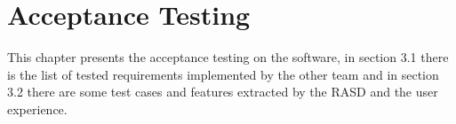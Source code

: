 \chapter{Acceptance Testing}
This chapter presents the acceptance testing on the software, in section 3.1 there is the list of tested requirements implemented by the other team and in section 3.2 there are some test cases and features extracted by the RASD and the user experience.


